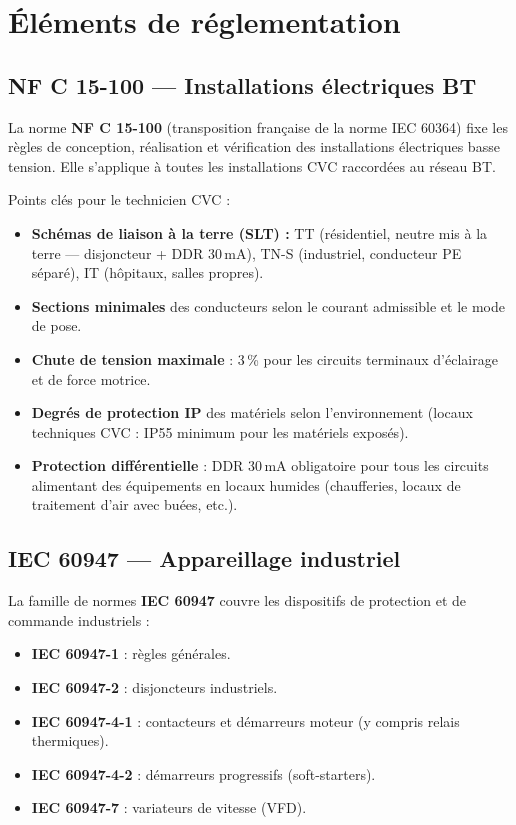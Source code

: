\section{Éléments de réglementation}

\subsection{NF C 15-100 — Installations électriques BT}

La norme \textbf{NF C 15-100} (transposition française de la norme IEC 60364) fixe les règles de conception, réalisation et vérification des installations électriques basse tension. Elle s'applique à toutes les installations CVC raccordées au réseau BT.

Points clés pour le technicien CVC :
\begin{itemize}
  \item \textbf{Schémas de liaison à la terre (SLT) :} TT (résidentiel, neutre mis à la terre — disjoncteur + DDR 30\,mA), TN-S (industriel, conducteur PE séparé), IT (hôpitaux, salles propres).
  \item \textbf{Sections minimales} des conducteurs selon le courant admissible et le mode de pose.
  \item \textbf{Chute de tension maximale} : 3\,\% pour les circuits terminaux d'éclairage et de force motrice.
  \item \textbf{Degrés de protection IP} des matériels selon l'environnement (locaux techniques CVC : IP55 minimum pour les matériels exposés).
  \item \textbf{Protection différentielle} : DDR 30\,mA obligatoire pour tous les circuits alimentant des équipements en locaux humides (chaufferies, locaux de traitement d'air avec buées, etc.).
\end{itemize}

\subsection{IEC 60947 — Appareillage industriel}

La famille de normes \textbf{IEC 60947} couvre les dispositifs de protection et de commande industriels :
\begin{itemize}
  \item \textbf{IEC 60947-1} : règles générales.
  \item \textbf{IEC 60947-2} : disjoncteurs industriels.
  \item \textbf{IEC 60947-4-1} : contacteurs et démarreurs moteur (y compris relais thermiques).
  \item \textbf{IEC 60947-4-2} : démarreurs progressifs (soft-starters).
  \item \textbf{IEC 60947-7} : variateurs de vitesse (VFD).
\end{itemize}

